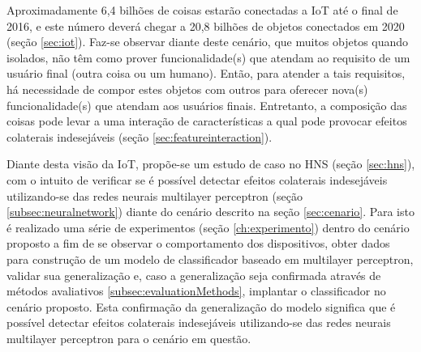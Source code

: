 Aproximadamente 6,4 bilhões de coisas estarão conectadas a IoT até o final de 2016, e este número deverá chegar a 20,8 bilhões de objetos conectados em 2020 (seção \ref{sec:iot}). Faz-se observar diante deste cenário, que muitos objetos quando isolados, não têm como prover funcionalidade(s) que atendam ao requisito de um usuário final (outra coisa ou um humano). Então, para atender a tais requisitos, há necessidade de compor estes objetos com outros para oferecer nova(s) funcionalidade(s) que atendam aos usuários finais. Entretanto, a composição das coisas pode levar a uma interação de características a qual pode provocar efeitos colaterais indesejáveis (seção \ref{sec:featureinteraction}).

Diante desta visão da IoT, propõe-se um estudo de caso no HNS (seção \ref{sec:hns}), com o intuito de verificar se é possível detectar efeitos colaterais indesejáveis utilizando-se das redes neurais multilayer perceptron (seção \ref{subsec:neuralnetwork}) diante do cenário descrito na seção \ref{sec:cenario}. Para isto é realizado uma série de experimentos (seção \ref{ch:experimento}) dentro do cenário proposto a fim de se observar o comportamento dos dispositivos, obter dados para construção de um modelo de classificador baseado em multilayer perceptron, validar sua generalização e, caso a generalização seja confirmada através de métodos avaliativos \ref{subsec:evaluationMethods}, implantar o classificador no cenário proposto. Esta confirmação da generalização do modelo significa que é possível detectar efeitos colaterais indesejáveis utilizando-se das redes neurais multilayer perceptron para o cenário em questão.